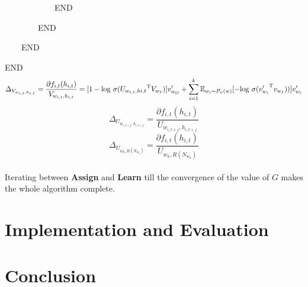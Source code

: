 \documentclass[12pt,a4paper,twoside]{book}
\begin{document}
\ \ \ \ \ \ \ \ \ \ \ \ END 

\ \ \ \ \ \ \ \  END

\ \ \ \ END

END
$$\Delta_{V_{w_{i,t},h_{i,t}}} = \frac{\partial f_{i,t}(h_{i,t})}{V_{w_{i,t},h_{i,t}}} = [1-\mathrm{log}\ \sigma({U_{w_{i,t},h{i,t}}}^{\mathrm{T}}V_{w_I})]v^\prime_{w_O}+\sum_{i=1}^k \mathbb{E}_{w_i\thicksim P_n(w)}[-\mathrm{log}\ \sigma({v^\prime_{w_i}}^{\mathrm{T}}v_{w_I}))]v^\prime_{w_i}$$
$$\Delta_{U_{w_{i,t+j},h_{i,t+j}}} = \frac{\partial f_{i,t}(h_{i,t})}{U_{w_{i,t+j},h_{i,t+j}}}$$
$$\Delta_{U_{w_k,R(N_{w_k})}} = \frac{\partial f_{i,t}(h_{i,t})}{U_{w_k,R(N_{w_k})}}$$

\paragraph{}
Iterating between \textbf{Assign} and \textbf{Learn} till the convergence of the value of $G$ makes the whole algorithm complete. 

\section{Implementation and Evaluation}

\section{Conclusion}
\end{document}
